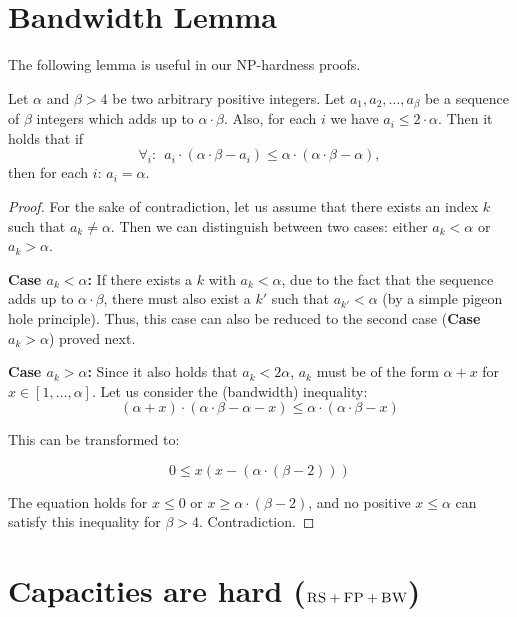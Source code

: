 \documentclass[9pt,twocolumn]{scrartcl}
\newcommand{\clauses}{\alpha}
\newcommand{\variables}{\beta}
\newcommand{\FP}{\textsc{FP}}
\newcommand{\RS}{\textsc{RS}}
\newcommand{\BW}{\textsc{BW}}
\begin{document}
\begin{appendix}


\section{Bandwidth Lemma}

The following lemma is useful in our NP-hardness proofs.

\begin{lemma}\label{lem:bandwidth-lemma}
  Let $\clauses$ and $\variables > 4$ be two arbitrary positive integers. Let $a_1, a_2, \ldots,
  a_{\variables}$ be a sequence of $\variables$ integers which adds up to $\clauses \cdot \variables$. Also, for
  each $i$ we have $a_i \leq 2 \cdot \clauses$. Then it holds that if
  $$ \forall_i:~~ a_i \cdot (\clauses \cdot \variables - a_i) \leq \clauses \cdot (\clauses \cdot \variables -
  \clauses), $$
\noindent  then for each $i$: $a_i = \clauses$.
\end{lemma}
\begin{proof}
For the sake of contradiction, let us assume that there exists an index $k$ such that
$a_k \neq \clauses$. Then we can distinguish between two cases:
either $a_k<\clauses$ or
$a_k>\clauses$.

\textbf{Case $a_k<\clauses$:} If there exists a $k$ with $a_k<\clauses$,
due to the fact that the sequence adds up to $\clauses \cdot \variables$,
there must also exist a $k'$ such that $a_{k'}<\clauses$ (by a simple
pigeon hole principle). Thus, this case can
also be reduced to the second case (\textbf{Case $a_k>\clauses$}) proved
next.

\textbf{Case $a_k>\clauses$:} Since it also holds that $a_k < 2\clauses$,
$a_k$ must be of the form $\clauses + x$ for $x \in [1, \ldots, \clauses]$.
Let us consider the (bandwidth) inequality:
$$ (\clauses + x) \cdot (\clauses \cdot \variables - \clauses - x) \leq \clauses \cdot (\clauses \cdot \variables - x) $$

This can be transformed to:

$$ 0 \leq x(x - (\clauses \cdot (\variables - 2))) $$

The equation holds for $x \leq 0$ or $x \geq \clauses \cdot (\variables - 2)$,
and no
positive $x \leq \clauses$ can satisfy this inequality for $\variables > 4$. Contradiction.
\end{proof}


\section{Capacities are hard ($\RS+\FP+\BW$)}


\end{appendix}
\end{document}
